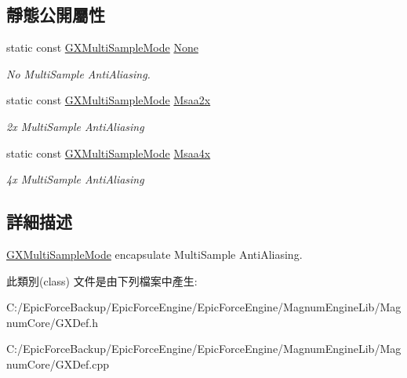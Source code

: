 \subsection*{靜態公開屬性}
\begin{DoxyCompactItemize}
\item 
static const \hyperlink{class_magnum_1_1_g_x_multi_sample_mode}{G\+X\+Multi\+Sample\+Mode} \hyperlink{class_magnum_1_1_g_x_multi_sample_mode_ae07cafe8184648e5db8d50d68aa6d140}{None}\hypertarget{class_magnum_1_1_g_x_multi_sample_mode_ae07cafe8184648e5db8d50d68aa6d140}{}\label{class_magnum_1_1_g_x_multi_sample_mode_ae07cafe8184648e5db8d50d68aa6d140}

\begin{DoxyCompactList}\small\item\em No Multi\+Sample Anti\+Aliasing. \end{DoxyCompactList}\item 
static const \hyperlink{class_magnum_1_1_g_x_multi_sample_mode}{G\+X\+Multi\+Sample\+Mode} \hyperlink{class_magnum_1_1_g_x_multi_sample_mode_a6d5c3e9396ce0f5288f631e7e00775eb}{Msaa2x}\hypertarget{class_magnum_1_1_g_x_multi_sample_mode_a6d5c3e9396ce0f5288f631e7e00775eb}{}\label{class_magnum_1_1_g_x_multi_sample_mode_a6d5c3e9396ce0f5288f631e7e00775eb}

\begin{DoxyCompactList}\small\item\em 2x Multi\+Sample Anti\+Aliasing \end{DoxyCompactList}\item 
static const \hyperlink{class_magnum_1_1_g_x_multi_sample_mode}{G\+X\+Multi\+Sample\+Mode} \hyperlink{class_magnum_1_1_g_x_multi_sample_mode_af77beb9480427baa8a82bc4df80db463}{Msaa4x}\hypertarget{class_magnum_1_1_g_x_multi_sample_mode_af77beb9480427baa8a82bc4df80db463}{}\label{class_magnum_1_1_g_x_multi_sample_mode_af77beb9480427baa8a82bc4df80db463}

\begin{DoxyCompactList}\small\item\em 4x Multi\+Sample Anti\+Aliasing \end{DoxyCompactList}\end{DoxyCompactItemize}


\subsection{詳細描述}
\hyperlink{class_magnum_1_1_g_x_multi_sample_mode}{G\+X\+Multi\+Sample\+Mode} encapsulate Multi\+Sample Anti\+Aliasing. 

此類別(class) 文件是由下列檔案中產生\+:\begin{DoxyCompactItemize}
\item 
C\+:/\+Epic\+Force\+Backup/\+Epic\+Force\+Engine/\+Epic\+Force\+Engine/\+Magnum\+Engine\+Lib/\+Magnum\+Core/G\+X\+Def.\+h\item 
C\+:/\+Epic\+Force\+Backup/\+Epic\+Force\+Engine/\+Epic\+Force\+Engine/\+Magnum\+Engine\+Lib/\+Magnum\+Core/G\+X\+Def.\+cpp\end{DoxyCompactItemize}
